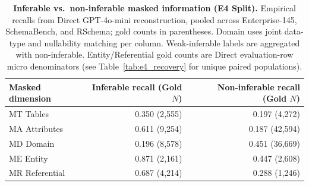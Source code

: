 \begin{table}[t]
\centering
\small
\caption{\textbf{Inferable vs.\ non-inferable masked information (E4 Split).}
Empirical recalls from Direct GPT-4o-mini reconstruction, pooled across Enterprise-145, SchemaBench, and RSchema; gold counts in parentheses. Domain uses joint data-type and nullability matching per column. Weak-inferable labels are aggregated with non-inferable. Entity/Referential gold counts are Direct evaluation-row micro denominators (see Table~\ref{tab:e4_recovery} for unique paired populations).}
\label{tab:e4_split}
\begin{tabular}{lrr}
\toprule
\textbf{Masked dimension} & \textbf{Inferable recall (Gold $N$)} & \textbf{Non-inferable recall (Gold $N$)} \\
\midrule
MT Tables       & 0.350 (2{,}555) & 0.197 (4{,}272) \\
MA Attributes   & 0.611 (9{,}254) & 0.187 (42{,}594) \\
MD Domain       & 0.196 (8{,}578) & 0.451 (36{,}669) \\
ME Entity       & 0.871 (2{,}161) & 0.447 (2{,}608) \\
MR Referential  & 0.687 (4{,}214) & 0.288 (1{,}246) \\
\bottomrule
\end{tabular}
\end{table}
